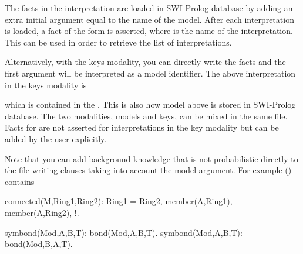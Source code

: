 \documentclass[letterpaper,10pt,english]{sphinxmanual}
\begin{document}
The facts in the interpretation are loaded in SWI-Prolog database by adding an extra initial argument equal to the name of the model.
After each interpretation is loaded, a fact of the form  is asserted, where  is the name of the interpretation.
This can be used in order to retrieve the list of interpretations.

Alternatively, with the keys modality, you can directly write the facts and the first argument will be interpreted as a model identifier.
The above interpretation in the keys modality is

%
\begin{sphinxVerbatim}[commandchars=\\\{\}]
\end{sphinxVerbatim}

which is contained in the .
This is also how model  above is stored in SWI-Prolog database.
The two modalities, models and keys, can be mixed in the same file.
Facts for  are not asserted for interpretations in the key modality but can be added by the user explicitly.

Note that you can add background knowledge that is not probabilistic directly to the file writing clauses taking into account the model argument.
For example () contains

%
\begin{sphinxVerbatim}[commandchars=\\\{\}]
connected(\PYGZus{}M,Ring1,Ring2):\PYGZhy{}
        Ring1 \PYGZbs{}= Ring2,
        member(A,Ring1),
        member(A,Ring2), !.

symbond(Mod,A,B,T):\PYGZhy{} bond(Mod,A,B,T).
symbond(Mod,A,B,T):\PYGZhy{} bond(Mod,B,A,T).
\end{sphinxVerbatim}
\end{document}
